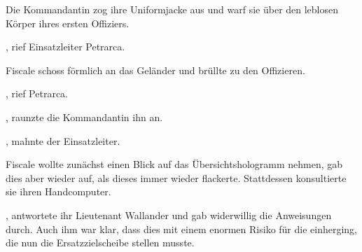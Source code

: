 \par

Die Kommandantin zog ihre Uniformjacke aus und warf sie über den leblosen Körper ihres ersten Offiziers.

\par

, rief Einsatzleiter Petrarca. 

\par

Fiscale schoss förmlich an das Geländer und brüllte zu den Offizieren. 

\par

, rief Petrarca. 

\par

, raunzte die Kommandantin ihn an. 

\par

, mahnte der Einsatzleiter.

\par

Fiscale wollte zunächst einen Blick auf das Übersichtshologramm nehmen, gab dies aber wieder auf, als dieses immer wieder flackerte. Stattdessen konsultierte sie ihren Handcomputer.

\par


\par

, antwortete ihr Lieutenant Wallander und gab widerwillig die Anweisungen durch. Auch ihm war klar, dass dies mit einem enormen Risiko für die  einherging, die nun die Ersatzzielscheibe stellen musste.
